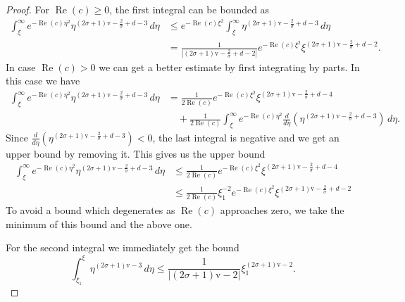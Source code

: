 \documentclass[11pt]{article}
\DeclareMathOperator{\real}{Re}
\newcommand{\normv}{\mathrm{v}}
\begin{document}
\begin{proof}
  For \(\real(c) \geq 0\), the first integral can be bounded as
  \begin{equation*}
    \begin{split}
      \int_{\xi}^{\infty} e^{-\real(c)\eta^{2}}\eta^{(2\sigma + 1)\normv - \frac{2}{\sigma} + d - 3}\,d\eta
      &\leq e^{-\real(c)\xi^{2}} \int_{\xi}^{\infty} \eta^{(2\sigma + 1)\normv - \frac{2}{\sigma} + d - 3}\,d\eta\\
      &= \frac{1}{|(2\sigma + 1)\normv - \frac{2}{\sigma} + d - 2|}e^{-\real(c)\xi^{2}}\xi^{(2\sigma + 1)\normv - \frac{2}{\sigma} + d - 2}.
    \end{split}
  \end{equation*}
  In case \(\real(c) > 0\) we can get a better estimate by first
  integrating by parts. In this case we have
  \begin{equation*}
    \begin{split}
      \int_{\xi}^{\infty} e^{-\real(c)\eta^{2}}\eta^{(2\sigma + 1)\normv - \frac{2}{\sigma} + d - 3}\,d\eta
      &= \frac{1}{2\real(c)}e^{-\real(c)\xi^{2}}\xi^{(2\sigma + 1)\normv - \frac{2}{\sigma} + d - 4}\\
      &\quad+ \frac{1}{2\real(c)}\int_{\xi}^{\infty} e^{-\real(c)\eta^{2}}\frac{d}{d\eta}\left(\eta^{(2\sigma + 1)\normv - \frac{2}{\sigma} + d - 3}\right)\,d\eta.
    \end{split}
  \end{equation*}
  Since
  \(\frac{d}{d\eta}\left(\eta^{(2\sigma + 1)\normv - \frac{2}{\sigma}
      + d - 3}\right) < 0\), the last integral is negative and we get
  an upper bound by removing it. This gives us the upper bound
  \begin{equation*}
    \begin{split}
      \int_{\xi}^{\infty} e^{-\real(c)\eta^{2}} \eta^{(2\sigma + 1)\normv - \frac{2}{\sigma} + d - 3}\,d\eta
      &\leq \frac{1}{2\real(c)}e^{-\real(c)\xi^{2}} \xi^{(2\sigma + 1)\normv - \frac{2}{\sigma} + d - 4}\\
      &\leq \frac{1}{2\real(c)}\xi_{1}^{-2}e^{-\real(c)\xi^{2}} \xi^{(2\sigma + 1)\normv - \frac{2}{\sigma} + d - 2}
    \end{split}
  \end{equation*}
  To avoid a bound which degenerates as \(\real(c)\) approaches zero,
  we take the minimum of this bound and the above one.

  For the second integral we immediately get the bound
  \begin{equation*}
    \int_{\xi_{1}}^{\xi} \eta^{(2\sigma + 1)\normv - 3}\,d\eta
    \leq \frac{1}{|(2\sigma + 1)\normv - 2|}\xi_{1}^{(2\sigma + 1)\normv - 2}.
  \end{equation*}
\end{proof}
\end{document}

